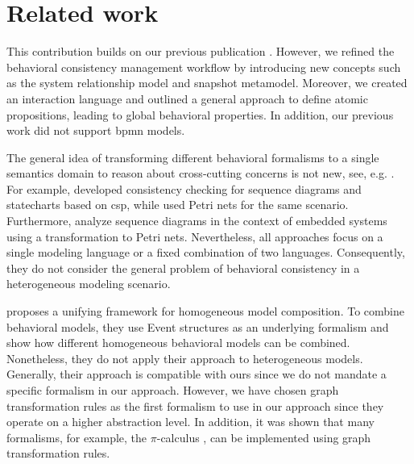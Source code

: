 \documentclass{jot}
\begin{document}
\section{Related work} \label{sec:related_work}
This contribution builds on our previous publication \cite{krauterBehavioralConsistencyHeterogeneous2021}.
However, we refined the behavioral consistency management workflow by introducing new concepts such as the system relationship model and snapshot metamodel.
Moreover, we created an interaction language and outlined a general approach to define atomic propositions, leading to global behavioral properties.
In addition, our previous work did not support \gls*{bpmn} models.

The general idea of transforming different behavioral formalisms to a single semantics domain to reason about cross-cutting concerns is not new, see, e.g. \cite{engelsMethodologySpecifyingAnalyzing2001}.
For example, \cite{kusterExplicitBehavioralConsistency2003} developed consistency checking for sequence diagrams and statecharts based on \gls*{csp}, while \cite{yaoConsistencyCheckingUML2006} used Petri nets for the same scenario.
Furthermore, \cite{cunhaFormalVerificationUML2011} analyze sequence diagrams in the context of embedded systems using a transformation to Petri nets.
Nevertheless, all approaches focus on a single modeling language or a fixed combination of two languages.
Consequently, they do not consider the general problem of behavioral consistency in a heterogeneous modeling scenario.

\cite{kienzleUnifyingFrameworkHomogeneous2019} proposes a unifying framework for homogeneous model composition.
To combine behavioral models, they use Event structures \cite{winskelEventStructures1987} as an underlying formalism and show how different homogeneous behavioral models can be combined.
Nonetheless, they do not apply their approach to heterogeneous models.
Generally, their approach is compatible with ours since we do not mandate a specific formalism in our approach.
However, we have chosen graph transformation rules as the first formalism to use in our approach since they operate on a higher abstraction level.
In addition, it was shown that many formalisms, for example, the $\pi$-calculus \cite{gadducciGraphRewritingPcalculus2007}, can be implemented using graph transformation rules.
\end{document}
